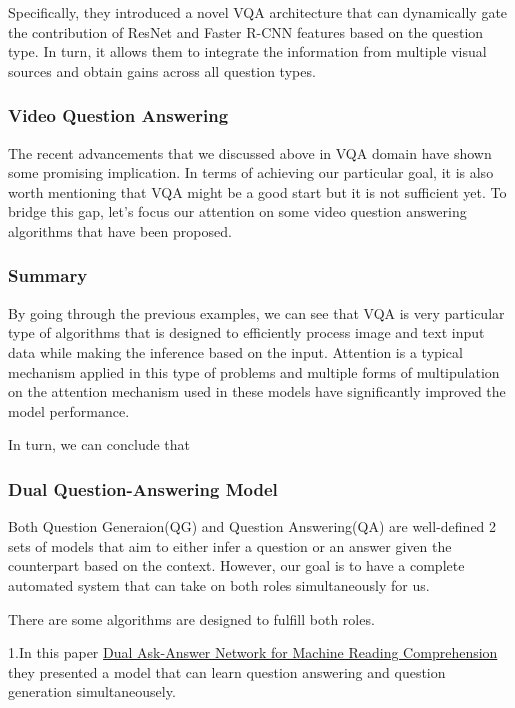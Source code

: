 \documentclass[]{book}
\theoremstyle{definition}
\theoremstyle{definition}
\theoremstyle{definition}
\theoremstyle{remark}
\begin{document}
Specifically, they introduced a novel VQA architecture that can
dynamically gate the contribution of ResNet and Faster R-CNN features
based on the question type. In turn, it allows them to integrate the
information from multiple visual sources and obtain gains across all
question types.

\subsubsection{Video Question Answering}\label{video-question-answering}

The recent advancements that we discussed above in VQA domain have shown
some promising implication. In terms of achieving our particular goal,
it is also worth mentioning that VQA might be a good start but it is not
sufficient yet. To bridge this gap, let's focus our attention on some
video question answering algorithms that have been proposed.

\subsubsection{Summary}\label{summary-1}

By going through the previous examples, we can see that VQA is very
particular type of algorithms that is designed to efficiently process
image and text input data while making the inference based on the input.
Attention is a typical mechanism applied in this type of problems and
multiple forms of multipulation on the attention mechanism used in these
models have significantly improved the model performance.

In turn, we can conclude that

\subsubsection{Dual Question-Answering
Model}\label{dual-question-answering-model}

Both Question Generaion(QG) and Question Answering(QA) are well-defined
2 sets of models that aim to either infer a question or an answer given
the counterpart based on the context. However, our goal is to have a
complete automated system that can take on both roles simultaneously for
us.

There are some algorithms are designed to fulfill both roles.

1.In this paper \href{https://arxiv.org/pdf/1809.01997.pdf}{Dual
Ask-Answer Network for Machine Reading Comprehension} they presented a
model that can learn question answering and question generation
simultaneousely.
\end{document}
